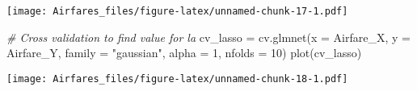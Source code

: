 \documentclass[]{article}
\newenvironment{Shaded}{\begin{snugshade}}{\end{snugshade}}
\newcommand{\AttributeTok}[1]{\textcolor[rgb]{0.77,0.63,0.00}{#1}}
\newcommand{\CommentTok}[1]{\textcolor[rgb]{0.56,0.35,0.01}{\textit{#1}}}
\newcommand{\ConstantTok}[1]{\textcolor[rgb]{0.00,0.00,0.00}{#1}}
\newcommand{\DecValTok}[1]{\textcolor[rgb]{0.00,0.00,0.81}{#1}}
\newcommand{\FunctionTok}[1]{\textcolor[rgb]{0.00,0.00,0.00}{#1}}
\newcommand{\NormalTok}[1]{#1}
\newcommand{\OtherTok}[1]{\textcolor[rgb]{0.56,0.35,0.01}{#1}}
\newcommand{\SpecialCharTok}[1]{\textcolor[rgb]{0.00,0.00,0.00}{#1}}
\newcommand{\StringTok}[1]{\textcolor[rgb]{0.31,0.60,0.02}{#1}}
\begin{document}
\begin{Shaded}
\end{Shaded}

\texttt{[image: Airfares\_files/figure-latex/unnamed-chunk-17-1.pdf]}

\begin{Shaded}
\begin{Highlighting}[]
\CommentTok{\# Cross validation to find value for la}
\NormalTok{cv\_lasso }\OtherTok{=} \FunctionTok{cv.glmnet}\NormalTok{(}\AttributeTok{x =}\NormalTok{ Airfare\_X, }\AttributeTok{y =}\NormalTok{ Airfare\_Y, }\AttributeTok{family =} \StringTok{"gaussian"}\NormalTok{, }\AttributeTok{alpha =} \DecValTok{1}\NormalTok{, }\AttributeTok{nfolds =} \DecValTok{10}\NormalTok{)}
\FunctionTok{plot}\NormalTok{(cv\_lasso)}
\end{Highlighting}
\end{Shaded}

\texttt{[image: Airfares\_files/figure-latex/unnamed-chunk-18-1.pdf]}
\end{document}
